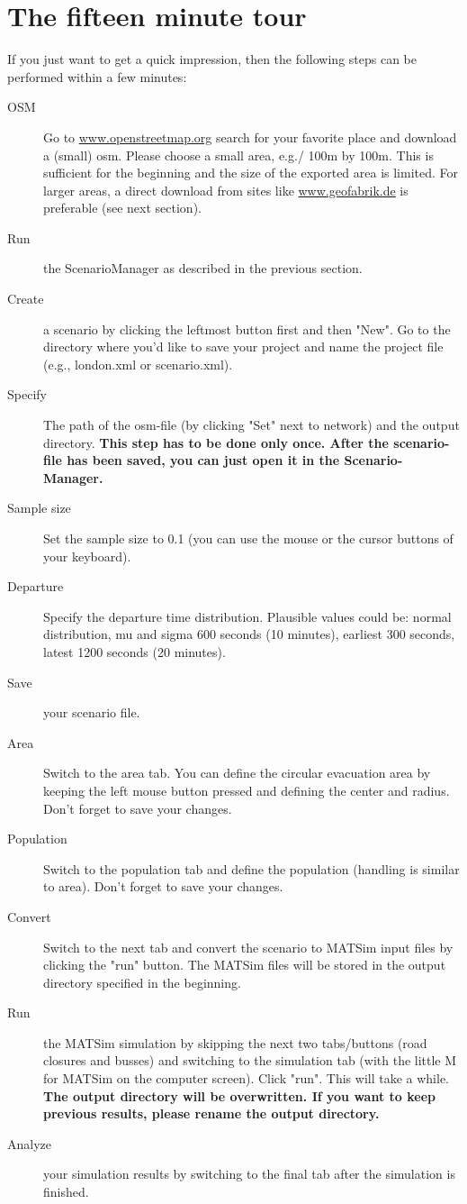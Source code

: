 \section{The fifteen minute tour}\label{evac:section:fifteenminute}
If you just want to get a quick impression, then the following steps can be performed within a few minutes:
\begin{description}
\item[OSM] Go to \url{www.openstreetmap.org} search for your favorite place and download a (small) osm. Please choose a small area, e.g./ 100m by 100m. This is sufficient for the beginning and the size of the exported area is limited. For larger areas, a direct download from sites like \url{www.geofabrik.de} is preferable (see next section).
\item[Run] the ScenarioManager as described in the previous section.
\item[Create] a scenario by clicking the leftmost button first and then "New". Go to the directory where you'd like to save your project and name the project file (e.g., london.xml or scenario.xml).
\item[Specify] The path of the osm-file (by clicking "Set" next to network) and the output directory.
\textbf{This step has to be done only once. After the scenario-file has been saved, you can just open it in the Scenario-Manager.}
\item[Sample size] Set the sample size to 0.1 (you can use the mouse or the cursor buttons of your keyboard).
\item[Departure] Specify the departure time distribution. Plausible values could be: normal distribution, mu and sigma 600 seconds (10 minutes), earliest 300 seconds, latest 1200 seconds (20 minutes).
\item[Save] your scenario file.
\item[Area] Switch to the area tab. You can define the circular evacuation area by keeping the left mouse button pressed and defining the center and radius. Don't forget to save your changes.
\item[Population] Switch to the population tab and define the population (handling is similar to area). Don't forget to save your changes.
\item[Convert] Switch to the next tab and convert the scenario to MATSim input files by clicking the "run" button. The MATSim files will be stored in the output directory specified in the beginning.
\item[Run] the MATSim simulation by skipping the next two tabs/buttons (road closures and busses) and switching to the simulation tab (with the little M for MATSim on the computer screen). Click "run". This will take a while.
\textbf{The output directory will be overwritten. If you want to keep previous results, please rename the output directory.}
\item[Analyze] your simulation results by switching to the final tab after the simulation is finished.

\end{description}

